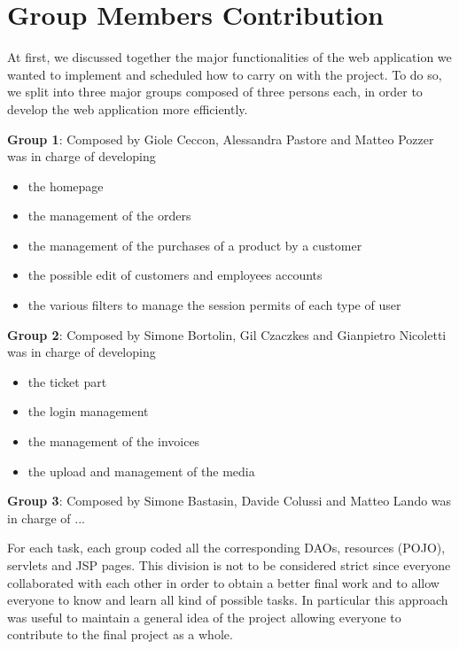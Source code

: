 \section{Group Members Contribution}

At first, we discussed together the major functionalities of the web application we wanted to implement and scheduled how to carry on with the project.
To do so, we split into three major groups composed of three persons each, in order to develop the web application more efficiently.


\begin{description}
	\item \textbf{Group 1}: Composed by Giole Ceccon, Alessandra Pastore and Matteo Pozzer was in charge of developing
	\begin{itemize}
		\item the homepage
		\item the management of the orders
		\item the management of the purchases of a product by a customer
		\item the possible edit of customers and employees accounts
		\item the various filters to manage the session permits of each type of user
	\end{itemize} 
	\item \textbf{Group 2}: Composed by Simone Bortolin, Gil Czaczkes and Gianpietro Nicoletti was in charge of developing
	\begin{itemize}
		\item the ticket part
		\item the login management
		\item the management of the invoices
		\item the upload and management of the media
	\end{itemize}
	\item \textbf{Group 3}: Composed by Simone Bastasin, Davide Colussi and Matteo Lando was in charge of ...

For each task, each group coded all the corresponding DAOs, resources (POJO), servlets and JSP pages.
This division is not to be considered strict since everyone collaborated with each other in order to obtain a better final work 
and to allow everyone to know and learn all kind of possible tasks. 
In particular this approach was useful to maintain a general idea of the project allowing everyone to contribute to the final project as a whole.

\end{description}
